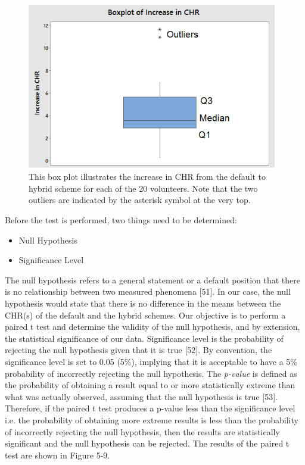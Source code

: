 \documentclass[12pt]{uthesis-v12}  %
\begin{document}
			\begin{figure}[h]
				\centering
				\includegraphics[width = 110mm]{images/chrDifferences.png}
				\caption[Relative Increase in CHR - Chart]{This box plot illustrates the increase in CHR from the default to hybrid scheme for each of the 20 volunteers. Note that the two outliers are indicated by the asterisk symbol at the very top.}
			\end{figure}
			
			Before the test is performed, two things need to be determined:
			\begin{itemize}
				\item Null Hypothesis
				\item Significance Level
			\end{itemize}
			
			The null hypothesis refers to a general statement or a default position that there is no relationship between two measured phenomena [51]. In our case, the null hypothesis would state that there is no difference in the means between the CHR(s) of the default and the hybrid schemes. Our objective is to perform a paired t test and determine the validity of the null hypothesis, and by extension, the statistical significance of our data. Significance level is the probability of rejecting the null hypothesis given that it is true [52]. By convention, the significance level is set to 0.05 (5\%), implying that it is acceptable to have a 5\% probability of incorrectly rejecting the null hypothesis. The {\em p-value} is defined as the probability of obtaining a result equal to or more statistically extreme than what was actually observed, assuming that the null hypothesis is true [53]. Therefore, if the paired t test produces a p-value less than the significance level i.e. the probability of obtaining more extreme results is less than the probability of incorrectly rejecting the null hypothesis, then the results are statistically significant and the null hypothesis can be rejected. The results of the paired t test are shown in Figure 5-9.
			
\end{document}
